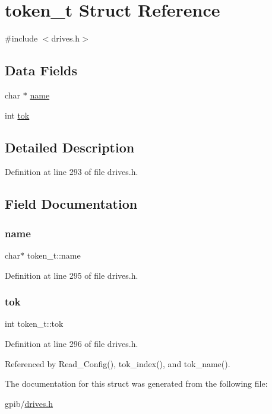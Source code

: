 \hypertarget{structtoken__t}{}\section{token\+\_\+t Struct Reference}
\label{structtoken__t}


{\ttfamily \#include $<$drives.\+h$>$}

\subsection*{Data Fields}
\begin{DoxyCompactItemize}
\item 
char $\ast$ \hyperlink{structtoken__t_a6280ddf4c14a5d6079686deb5f415dfb}{name}
\item 
int \hyperlink{structtoken__t_ab6ff2146ea8b1275e249fd0412988215}{tok}
\end{DoxyCompactItemize}


\subsection{Detailed Description}


Definition at line 293 of file drives.\+h.



\subsection{Field Documentation}
\mbox{\label{structtoken__t_a6280ddf4c14a5d6079686deb5f415dfb}} 
\subsubsection{\texorpdfstring{name}{name}}
{\footnotesize\ttfamily char$\ast$ token\+\_\+t\+::name}



Definition at line 295 of file drives.\+h.

\mbox{\label{structtoken__t_ab6ff2146ea8b1275e249fd0412988215}} 
\subsubsection{\texorpdfstring{tok}{tok}}
{\footnotesize\ttfamily int token\+\_\+t\+::tok}



Definition at line 296 of file drives.\+h.



Referenced by Read\+\_\+\+Config(), tok\+\_\+index(), and tok\+\_\+name().



The documentation for this struct was generated from the following file\+:\begin{DoxyCompactItemize}
\item 
gpib/\hyperlink{drives_8h}{drives.\+h}\end{DoxyCompactItemize}
